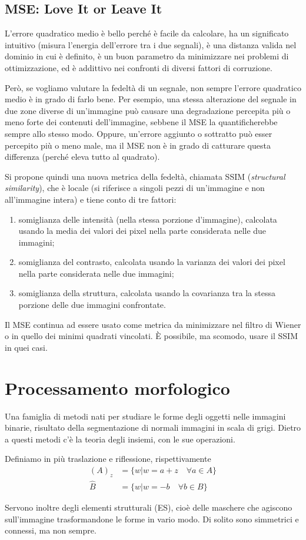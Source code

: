 \documentclass[a4paper,11pt]{article}
\begin{document}
\subsection{MSE: Love It or Leave It}
L'errore quadratico medio è bello perché è facile da calcolare, ha un significato intuitivo (misura l'energia dell'errore tra i due
segnali), è una distanza valida nel dominio in cui è definito, è un buon parametro da minimizzare nei problemi di ottimizzazione, ed è addittivo
nei confronti di diversi fattori di corruzione.
\par
Però, se vogliamo valutare la fedeltà di un segnale, non sempre l'errore quadratico medio è in grado di farlo bene.
Per esempio, una stessa alterazione del segnale in due zone diverse di un'immagine può causare una degradazione percepita più o meno forte
dei contenuti dell'immagine, sebbene il MSE la quantificherebbe sempre allo stesso modo.
Oppure, un'errore aggiunto o sottratto può esser percepito più o meno male, ma il MSE non è in grado di catturare questa differenza (perché eleva
tutto al quadrato).
\par
Si propone quindi una nuova metrica della fedeltà, chiamata SSIM (\textit{structural similarity}), che è locale (si riferisce a singoli pezzi
di un'immagine e non all'immagine intera) e tiene conto di tre fattori:
\begin{enumerate}
    \item somiglianza delle intensità (nella stessa porzione d'immagine), calcolata usando la media dei valori dei pixel nella parte considerata
    nelle due immagini;
    \item somiglianza del contrasto, calcolata usando la varianza dei valori dei pixel nella parte considerata nelle due immagini;
    \item somiglianza della struttura, calcolata usando la covarianza tra la stessa porzione delle due immagini confrontate.
\end{enumerate}
\par
Il MSE continua ad essere usato come metrica da minimizzare nel filtro di Wiener o in quello dei minimi quadrati vincolati. È possibile, ma scomodo,
usare il SSIM in quei casi.

\newpage

\section{Processamento morfologico}
Una famiglia di metodi nati per studiare le forme degli oggetti nelle immagini binarie, risultato della segmentazione di normali immagini in scala di grigi.
Dietro a questi metodi c'è la teoria degli insiemi, con le sue operazioni.
\par
Definiamo in più traslazione e riflessione, rispettivamente
\begin{align*}
    (A)_z &= \{w | w = a+z \quad \forall a \in A\} \\
    \hat{B} &= \{w | w = -b \quad \forall b \in B\}
\end{align*}
\par
Servono inoltre degli elementi strutturali (ES), cioè delle maschere che agiscono sull'immagine trasformandone le forme in vario modo. Di solito
sono simmetrici e connessi, ma non sempre.
\end{document}
